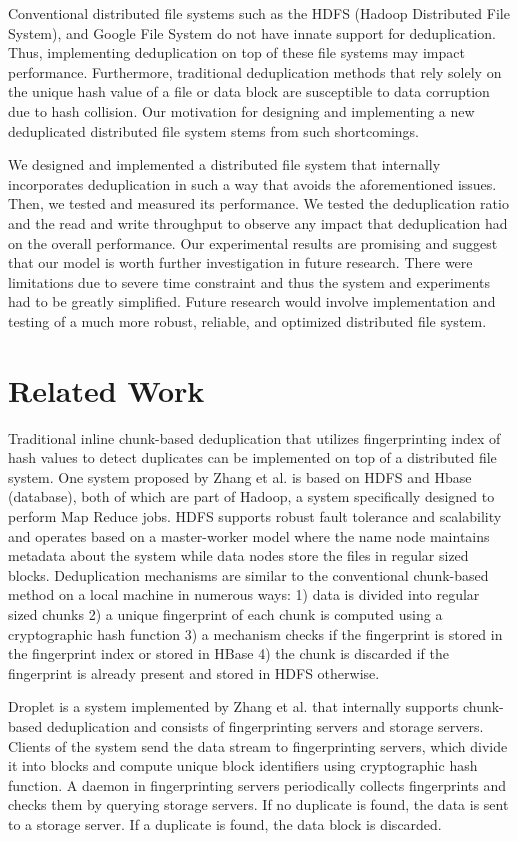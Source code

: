 \documentclass[11pt,twocolumn]{article}
\begin{document}
Conventional distributed file systems such as the HDFS (Hadoop Distributed File System), and Google File System do not have innate support for deduplication\cite{GFS}\cite{HDFS}. Thus, implementing deduplication on top of these file systems may impact performance. Furthermore, traditional deduplication methods that rely solely on the unique hash value of a file or data block are susceptible to data corruption due to hash collision. Our motivation for designing and implementing a new deduplicated distributed file system stems from such shortcomings. 

We designed and implemented a distributed file system that internally incorporates deduplication in such a way that avoids the aforementioned issues. Then, we tested and measured its performance.  We tested the deduplication ratio and the read and write throughput to observe any impact that deduplication had on the overall performance. Our experimental results are promising and suggest that our model is worth further investigation in future research. There were limitations due to severe time constraint and thus the system and experiments had to be greatly simplified. Future research would involve implementation and testing of a much more robust, reliable, and optimized distributed file system.


\section {Related Work}\label{relwork}
Traditional inline chunk-based deduplication that utilizes fingerprinting index of hash values to detect duplicates can be implemented on top of a distributed file system. One system proposed by Zhang et al. is based on HDFS and Hbase (database), both of which are part of Hadoop, a system specifically designed to perform Map Reduce jobs. HDFS supports robust fault tolerance and scalability and operates based on a master-worker model where the name node maintains metadata about the system while data nodes store the files in regular sized blocks. Deduplication mechanisms are similar to the conventional chunk-based method on a local machine in numerous ways: 1) data is divided into regular sized chunks 2) a unique fingerprint of each chunk is computed using a cryptographic hash function 3) a mechanism checks if the fingerprint is stored in the fingerprint index or stored in HBase 4) the chunk is discarded if the fingerprint is already present and stored in HDFS otherwise\cite{HDFSDe}. 

Droplet is a system implemented by Zhang et al. that internally supports chunk-based deduplication and consists of fingerprinting servers and storage servers\cite{Droplet}. Clients of the system send the data stream to fingerprinting servers, which divide it into blocks and compute unique block identifiers using cryptographic hash function. A daemon in fingerprinting servers periodically collects fingerprints and checks them by querying storage servers. If no duplicate is found, the data is sent to a storage server. If a duplicate is found, the data block is discarded.
\end{document}
